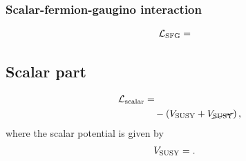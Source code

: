 \documentclass[CheatSheet]{subfiles}
\begin{document}
\subsubsection{Scalar-fermion-gaugino interaction}
\begin{equation}
\begin{split}
  \mathcal L\w{SFG} &=
 
\end{split}
\end{equation}

\subsection{Scalar part}
\begin{equation}
\begin{split}
  \mathcal L\w{scalar} &=
 
\\&\quad -\left(V\w{SUSY} + V_{\cancel{\mathrm{SUSY}}}\right),
\end{split}
\end{equation}
where the scalar potential is given by
\begin{equation}
  \begin{split}
   V_{\mathrm{SUSY}} &= .
  \end{split}
\end{equation}
\end{document}
